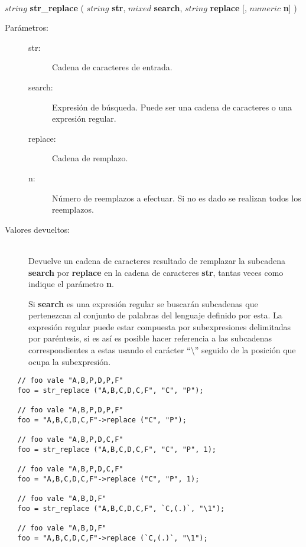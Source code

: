 \hfill \\ $string$ \textbf{str\_replace} ( $string$ \textbf{str}, $mixed$ \textbf{search}, $string$ \textbf{replace} [, $numeric$ \textbf{n}] )  
\begin{description}
\item [Parámetros:] \hfill 
   \begin{description}
   \item[str:] Cadena de caracteres de entrada.
   \item[search:] Expresión de búsqueda. Puede ser una cadena de caracteres o una expresión regular.  
   \item[replace:] Cadena de remplazo.
   \item[n:] Número de reemplazos a efectuar. Si no es dado se realizan todos los reemplazos.
   \end{description}
\item[Valores devueltos:] \hfill \\
   Devuelve un cadena de caracteres resultado de remplazar la subcadena \textbf{search}  por \textbf{replace}
   en la cadena de caracteres \textbf{str}, tantas veces como indique el parámetro \textbf{n}.
   
   Si \textbf{search} es una expresión regular se buscarán subcadenas que pertenezcan al conjunto de palabras del lenguaje definido por esta. La
   expresión regular puede estar compuesta por subexpresiones delimitadas por paréntesis, si es así es posible hacer referencia a las subcadenas 
   correspondientes a estas usando el carácter ``\textbackslash'' seguido de la posición que ocupa la subexpresión.
   
\end{description}


\begin{lstlisting}
   // foo vale "A,B,P,D,P,F" 
   foo = str_replace ("A,B,C,D,C,F", "C", "P"); 
   
   // foo vale "A,B,P,D,P,F" 
   foo = "A,B,C,D,C,F"->replace ("C", "P");

   // foo vale "A,B,P,D,C,F" 
   foo = str_replace ("A,B,C,D,C,F", "C", "P", 1); 
   
   // foo vale "A,B,P,D,C,F" 
   foo = "A,B,C,D,C,F"->replace ("C", "P", 1);

   // foo vale "A,B,D,F" 
   foo = str_replace ("A,B,C,D,C,F", `C,(.)`, "\1"); 
   
   // foo vale "A,B,D,F" 
   foo = "A,B,C,D,C,F"->replace (`C,(.)`, "\1");
\end{lstlisting}
\hfill\\ 

